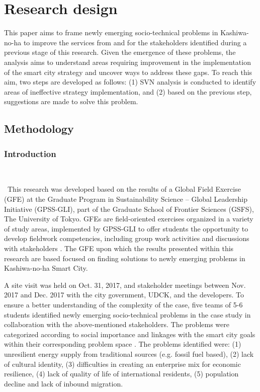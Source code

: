 \documentclass[conference]{IEEEtran}
\begin{document}
\section{\textbf{Research design}}

This paper aims to frame newly emerging socio-technical problems in Kashiwa-no-ha to improve the services from and for the stakeholders identified during a previous stage of this research. Given the emergence of these problems, the analysis aims to understand areas requiring improvement in the implementation of the smart city strategy and uncover ways to address these gaps. To reach this aim, two steps are developed as follows: (1) SVN analysis is conducted to identify areas of ineffective strategy implementation, and (2) based on the previous step, suggestions are made to solve this problem.

\subsection{\textbf{Methodology}}

\subsubsection{\textbf{Introduction}}\

\
This research was developed based on the results of a Global Field Exercise (GFE) at the Graduate Program in Sustainability Science – Global Leadership Initiative (GPSS-GLI), part of the Graduate School of Frontier Sciences (GSFS), The University of Tokyo. GFEs are field-oriented exercises organized in a variety of study areas, implemented by GPSS-GLI to offer students the opportunity to develop fieldwork competencies, including group work activities and discussions with stakeholders \cite{chan2004systems}. The GFE upon which the results presented within this research are based focused on finding solutions to newly emerging problems in Kashiwa-no-ha Smart City.

A site visit was held on Oct. 31, 2017, and stakeholder meetings between Nov. 2017 and Dec. 2017 with the city government, UDCK, and the developers. To ensure a better understanding of the complexity of the case, five teams of 5-6 students identified newly emerging socio-technical problems in the case study in collaboration with the above-mentioned stakeholders. The problems were categorized according to social importance and linkages with the smart city goals within their corresponding problem space \cite{de2011engineering}. The problems identified were: (1) unresilient energy supply from traditional sources (e.g. fossil fuel based), (2) lack of cultural identity, (3) difficulties in creating an enterprise mix for economic resilience, (4) lack of quality of life of international residents, (5) population decline and lack of inbound migration.
\end{document}
